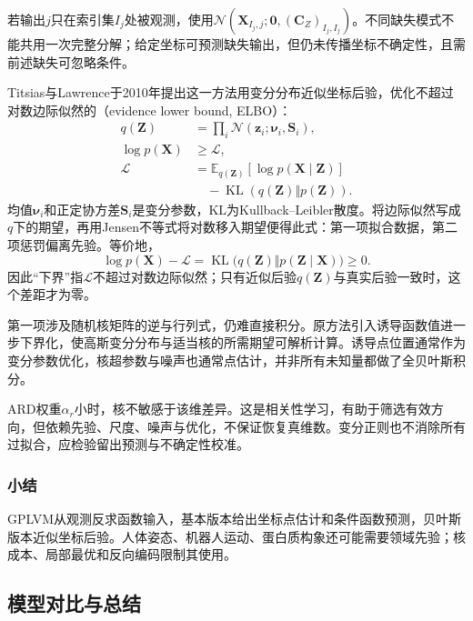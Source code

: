 若输出$j$只在索引集$I_j$处被观测，使用$\mathcal{N}(\bm{X}_{I_j,j};\bm{0},(\bm{C}_Z)_{I_j,I_j})$。不同缺失模式不能共用一次完整分解；给定坐标可预测缺失输出，但仍未传播坐标不确定性，且需前述缺失可忽略条件。

Titsias与Lawrence于2010年提出这一方法用变分分布近似坐标后验，优化不超过对数边际似然的（evidence lower bound, ELBO）：
\begin{equation}
\label{eq:dim-gplvm-elbo}
\begin{aligned}
q(\bm{Z})&=\prod_i\mathcal{N}(\bm{z}_i;\bm{\nu}_i,\bm{S}_i),\\
\log p(\bm{X})&\geq\mathcal{L},\\
\mathcal{L}
&=\mathbb{E}_{q(\bm{Z})}[\log p(\bm{X}\mid\bm{Z})]\\
&\quad-\operatorname{KL}(q(\bm{Z})\Vert p(\bm{Z})).
\end{aligned}
\end{equation}
均值$\bm{\nu}_i$和正定协方差$\bm{S}_i$是变分参数，KL为Kullback--Leibler散度。将边际似然写成$q$下的期望，再用Jensen不等式将对数移入期望便得此式：第一项拟合数据，第二项惩罚偏离先验。等价地，
\[
  \log p(\bm{X})-\mathcal{L}
  =\operatorname{KL}\bigl(q(\bm{Z})\Vert p(\bm{Z}\mid\bm{X})\bigr)
  \geq0.
\]
因此“下界”指$\mathcal{L}$不超过对数边际似然；只有近似后验$q(\bm{Z})$与真实后验一致时，这个差距才为零。

第一项涉及随机核矩阵的逆与行列式，仍难直接积分。原方法引入诱导函数值进一步下界化，使高斯变分分布与适当核的所需期望可解析计算。诱导点位置通常作为变分参数优化，核超参数与噪声也通常点估计，并非所有未知量都做了全贝叶斯积分。

ARD权重$\alpha_r$小时，核不敏感于该维差异。这是相关性学习，有助于筛选有效方向，但依赖先验、尺度、噪声与优化，不保证恢复真维数。变分正则也不消除所有过拟合，应检验留出预测与不确定性校准。

\subsubsection{小结}
\label{sec:dim-gplvm-summary}

GPLVM从观测反求函数输入，基本版本给出坐标点估计和条件函数预测，贝叶斯版本近似坐标后验。人体姿态、机器人运动、蛋白质构象还可能需要领域先验；核成本、局部最优和反向编码限制其使用。

\subsection{模型对比与总结}
\label{sec:dim-probabilistic-comparison}

